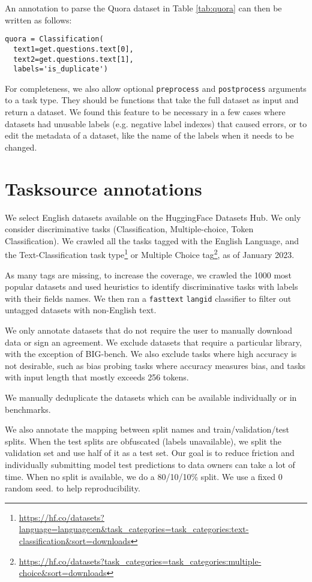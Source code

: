 \documentclass[11pt]{article}
\begin{document}
\mbox{} 

An annotation to parse the Quora dataset in Table \ref{tab:quora} can then be written as follows:
\begin{verbatim}
quora = Classification(
  text1=get.questions.text[0], 
  text2=get.questions.text[1],
  labels='is_duplicate')
\end{verbatim}

For completeness, we also allow optional \texttt{preprocess} and \texttt{postprocess} arguments to a task type. They should be functions that take the full dataset as input and return a dataset. We found this feature to be necessary in a few cases where datasets had unusable labels (e.g. negative label indexes) that caused errors, or to edit the metadata of a dataset, like the name of the labels when it needs to be changed.

\section{Tasksource annotations}
We select English datasets available on the HuggingFace Datasets Hub. We only consider discriminative tasks (Classification, Multiple-choice, Token Classification). We crawled all the tasks tagged with the English Language, and the Text-Classification task type\footnote{\url{https://hf.co/datasets?language=language:en&task_categories=task_categories:text-classification&sort=downloads}}
or Multiple Choice tag\footnote{\url{https://hf.co/datasets?task_categories=task_categories:multiple-choice&sort=downloads}}, as of January 2023.

As many tags are missing, to increase the coverage, we crawled the 1000 most popular datasets and used heuristics to identify discriminative tasks with labels with their fields names. We then ran a \texttt{fasttext} \citep{joulin2016fasttext} \texttt{langid} classifier to filter out untagged datasets with non-English text.

We only annotate datasets that do not require the user to manually download data or sign an agreement. We exclude datasets that require a particular library, with the exception of BIG-bench.
We also exclude tasks where high accuracy is not desirable, such as bias probing tasks \citep{nangia-etal-2020-crows} where accuracy measures bias, and tasks with input length that mostly exceeds 256 tokens.

 We  manually deduplicate the datasets which can be available individually or in benchmarks.

We also annotate the mapping between split names and train/validation/test splits. When the test splits are obfuscated (labels unavailable), we split the validation set and use half of it as a test set. Our goal is to reduce friction and individually submitting model test predictions to data owners can take a lot of time.
When no split is available, we do a 80/10/10\% split. We use a fixed 0 random seed. to help reproducibility.
\end{document}
